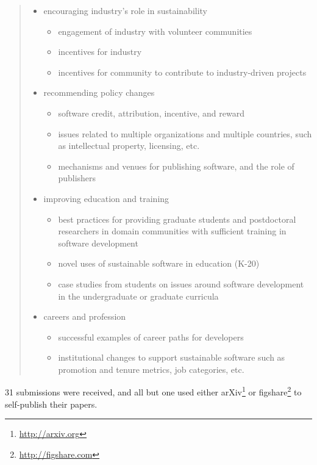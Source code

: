 \documentclass[11pt, oneside]{amsart}
\begin{document}
\begin{quote}
\begin{itemize}
\item encouraging industry's role in sustainability
\begin{itemize}
\item engagement of industry with volunteer communities
\item incentives for industry
\item incentives for community to contribute to industry-driven projects
\end{itemize}

\item recommending policy changes
\begin{itemize}
\item software credit, attribution, incentive, and reward
\item issues related to multiple organizations and multiple countries, such as
intellectual property, licensing, etc.
\item mechanisms and venues for publishing software, and the role of publishers
\end{itemize}

\item improving education and training
\begin{itemize}
\item best practices for providing graduate students and postdoctoral
researchers in domain communities with sufficient training in software
development
\item novel uses of sustainable software in education (K-20)
\item case studies from students on issues around software development in the
undergraduate or graduate curricula
\end{itemize}

\item careers and profession
\begin{itemize}
\item successful examples of career paths for developers
\item institutional changes to support sustainable software such as promotion
and tenure metrics, job categories, etc.
\end{itemize}

\end{itemize}

\end{quote}


31 submissions were received, and all but one used either
arXiv\footnote{\url{http://arxiv.org}} or
figshare\footnote{\url{http://figshare.com}} to self-publish their papers.
\end{document}
